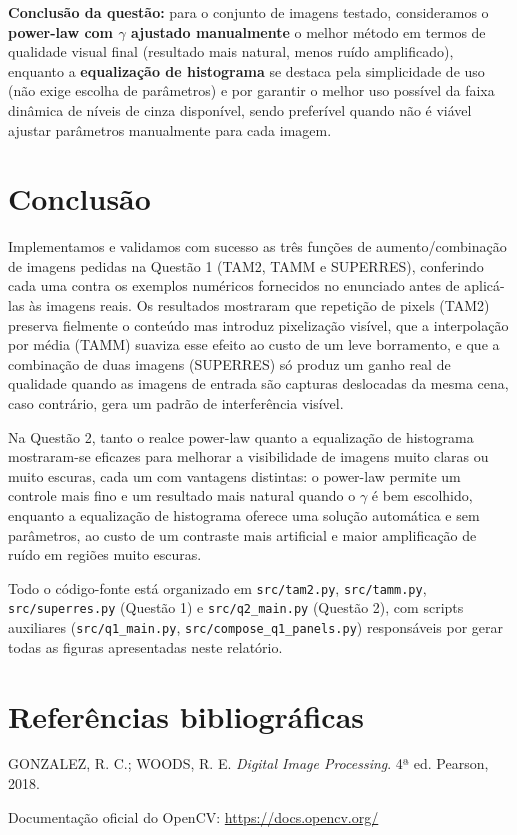 \documentclass[10pt,twocolumn,letterpaper]{article}
\begin{document}
\noindent \textbf{Conclusão da questão:} para o conjunto de imagens testado,
consideramos o \textbf{power-law com $\gamma$ ajustado manualmente} o melhor
método em termos de qualidade visual final (resultado mais natural, menos
ruído amplificado), enquanto a \textbf{equalização de histograma} se
destaca pela simplicidade de uso (não exige escolha de parâmetros) e por
garantir o melhor uso possível da faixa dinâmica de níveis de cinza
disponível, sendo preferível quando não é viável ajustar parâmetros
manualmente para cada imagem.

\section{Conclusão}

Implementamos e validamos com sucesso as três funções de aumento/combinação
de imagens pedidas na Questão 1 (TAM2, TAMM e SUPERRES), conferindo cada uma
contra os exemplos numéricos fornecidos no enunciado antes de aplicá-las às
imagens reais. Os resultados mostraram que repetição de pixels (TAM2)
preserva fielmente o conteúdo mas introduz pixelização visível, que a
interpolação por média (TAMM) suaviza esse efeito ao custo de um leve
borramento, e que a combinação de duas imagens (SUPERRES) só produz um
ganho real de qualidade quando as imagens de entrada são capturas
deslocadas da mesma cena, caso contrário, gera um padrão de interferência
visível.

Na Questão 2, tanto o realce power-law quanto a equalização de histograma
mostraram-se eficazes para melhorar a visibilidade de imagens muito claras
ou muito escuras, cada um com vantagens distintas: o power-law permite um
controle mais fino e um resultado mais natural quando o $\gamma$ é bem
escolhido, enquanto a equalização de histograma oferece uma solução
automática e sem parâmetros, ao custo de um contraste mais artificial e
maior amplificação de ruído em regiões muito escuras.

Todo o código-fonte está organizado em \texttt{src/tam2.py},
\texttt{src/tamm.py}, \texttt{src/superres.py} (Questão 1) e
\texttt{src/q2\_main.py} (Questão 2), com scripts auxiliares
(\texttt{src/q1\_main.py}, \texttt{src/compose\_q1\_panels.py}) responsáveis
por gerar todas as figuras apresentadas neste relatório.

\section{Referências bibliográficas}

GONZALEZ, R. C.; WOODS, R. E. \emph{Digital Image Processing}. 4ª ed.
Pearson, 2018.

Documentação oficial do OpenCV: \url{https://docs.opencv.org/}
\end{document}
